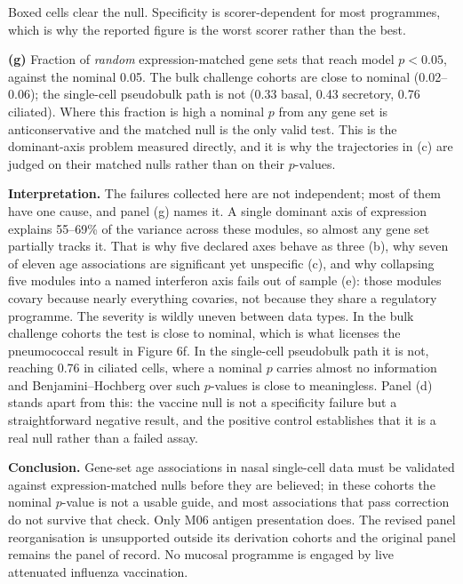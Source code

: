 \documentclass[11pt,a4paper]{article}
\begin{document}
{Boxed cells clear the null. Specificity is scorer-dependent for most programmes, which is why
the reported figure is the worst scorer rather than the best.
\par
\textbf{(g)} Fraction of \emph{random} expression-matched gene sets that reach model $p<0.05$,
against the nominal 0.05. The bulk challenge cohorts are close to nominal (0.02--0.06); the
single-cell pseudobulk path is not (0.33 basal, 0.43 secretory, 0.76 ciliated). Where this
fraction is high a nominal $p$ from any gene set is anticonservative and the matched null is
the only valid test. This is the dominant-axis problem measured directly, and it is why the
trajectories in (c) are judged on their matched nulls rather than on their $p$-values.
\par
\textbf{Interpretation.} The failures collected here are not independent; most of them have
one cause, and panel (g) names it. A single dominant axis of expression explains 55--69\% of
the variance across these modules, so almost any gene set partially tracks it. That is why
five declared axes behave as three (b), why seven of eleven age associations are significant
yet unspecific (c), and why collapsing five modules into a named interferon axis fails out of
sample (e): those modules covary because nearly everything covaries, not because they share a
regulatory programme. The severity is wildly uneven between data types. In the bulk challenge
cohorts the test is close to nominal, which is what licenses the pneumococcal result in
Figure 6f. In the single-cell pseudobulk path it is not, reaching 0.76 in ciliated cells,
where a nominal $p$ carries almost no information and Benjamini--Hochberg over such
$p$-values is close to meaningless. Panel (d) stands apart from this: the vaccine null is not
a specificity failure but a straightforward negative result, and the positive control
establishes that it is a real null rather than a failed assay.
\par
\textbf{Conclusion.} Gene-set age associations in nasal single-cell data must be validated
against expression-matched nulls before they are believed; in these cohorts the nominal
$p$-value is not a usable guide, and most associations that pass correction do not survive
that check. Only M06 antigen presentation does. The revised panel reorganisation is
unsupported outside its derivation cohorts and the original panel remains the panel of
record. No mucosal programme is engaged by live attenuated influenza vaccination.}
\end{document}

